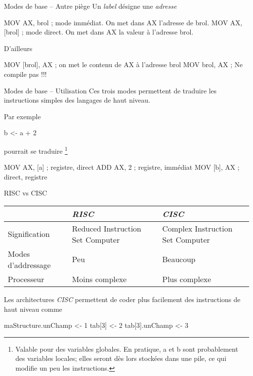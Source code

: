 \documentclass[14pt]{beamer}
\begin{document}
\begin{frame}[fragile]{Modes de base -- Autre piège}
Un \emph{label} désigne une \emph{adresse}
\begin{Asm}
	MOV AX, brol      ; mode immédiat. On met dans AX l'adresse de brol.
	MOV AX, [brol]    ; mode direct. On met dans AX la valeur à l'adresse brol.
\end{Asm}
\bigskip
D'ailleurs
\begin{Asm}
	MOV [brol], AX    ; on met le contenu de AX à l'adresse brol
	MOV brol, AX      ; Ne compile pas !!!
\end{Asm}
\end{frame}

\begin{frame}[fragile]{Modes de base -- Utilisation}
Ces trois modes permettent de traduire les instructions simples
des langages de haut niveau.

\medskip
Par exemple
\begin{Code}
	b <- a + 2
\end{Code}
pourrait se traduire%
\footnote{
	\scriptsize{Valable pour des variables globales.
	En pratique, a et b sont probablement des variables locales;
	elles seront dès lors stockées dans une pile, ce qui modifie
	un peu les instructions.}
}
\begin{Asm}
	MOV AX, [a]   ; registre, direct
	ADD AX, 2     ; registre, immédiat
	MOV [b], AX   ; direct, registre
\end{Asm}
\end{frame}

\begin{frame}[fragile]{RISC vs CISC}

\begin{footnotesize}
\begin{tabular}{p{3cm}p{3cm}p{3cm}}
	& \emph{RISC} & \emph{CISC} \\\hline
Signification & Reduced Instruction Set Computer & Complex Instruction Set Computer \\\hline
Modes d'addressage & Peu & Beaucoup \\\hline
Processeur & Moins complexe & Plus complexe \\\hline
\end{tabular}
\end{footnotesize}

\bigskip
Les architectures \emph{CISC} permettent de coder plus facilement
des instructions de haut niveau comme
\begin{Code}
	maStructure.unChamp <- 1
	tab[3] <- 2
	tab[3].unChamp <- 3
\end{Code}
\end{frame}
\end{document}
